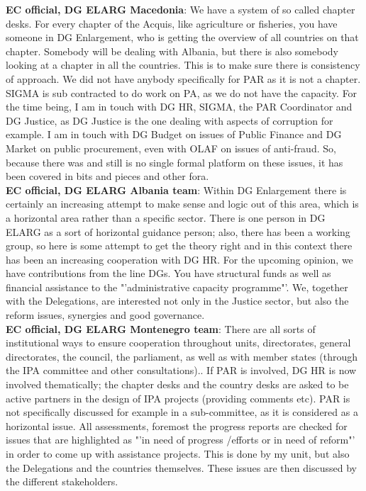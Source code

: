 \textbf{EC official, DG ELARG Macedonia}: We have a system of so called chapter desks. For every chapter of the Acquis, like agriculture or fisheries, you have someone in DG Enlargement, who is getting the overview of all countries on that chapter. Somebody will be dealing with Albania, but there is also somebody looking at a chapter in all the countries. This is to make sure there is consistency of approach. We did not have anybody specifically for PAR as it is not a chapter. SIGMA is sub contracted to do work on PA, as we do not have the capacity. For the time being, I am in touch with DG HR, SIGMA, the PAR Coordinator and DG Justice, as DG Justice is the one dealing with aspects of corruption for example. I am in touch with DG Budget on issues of Public Finance and DG Market on public procurement, even with OLAF on issues of anti-fraud. So, because there was and still is no single formal platform on these issues, it has been covered in bits and pieces and other fora. \\
\textbf{EC official, DG ELARG Albania team}: Within DG Enlargement there is certainly an increasing attempt to make sense and logic out of this area, which is a horizontal area rather than a specific sector. There is one person in DG ELARG as a sort of horizontal guidance person; also, there has been a working group, so here is some attempt to get the theory right and in this context there has been an increasing cooperation with DG HR. For the upcoming opinion, we have contributions from the line DGs. You have structural funds as well as financial assistance to the "'administrative capacity programme"'. We, together with the Delegations, are interested not only in the Justice sector, but also the reform issues, synergies and good governance.\\
\textbf{EC official, DG ELARG Montenegro team}: There are all sorts of institutional ways to ensure cooperation throughout units, directorates, general directorates, the council, the parliament, as well as with member states (through the IPA committee and other consultations).. If PAR is involved, DG HR is now involved thematically; the chapter desks and the country desks are asked to be active partners in the design of IPA projects (providing comments etc). PAR is not specifically discussed for example in a sub-committee, as it is considered as a horizontal issue.  All assessments, foremost the progress reports are checked for issues that are highlighted as "'in need of progress /efforts or in need of reform"' in order to come up with assistance projects. This is done by my unit, but also the Delegations and the countries themselves. These issues are then discussed by the different stakeholders.\\
